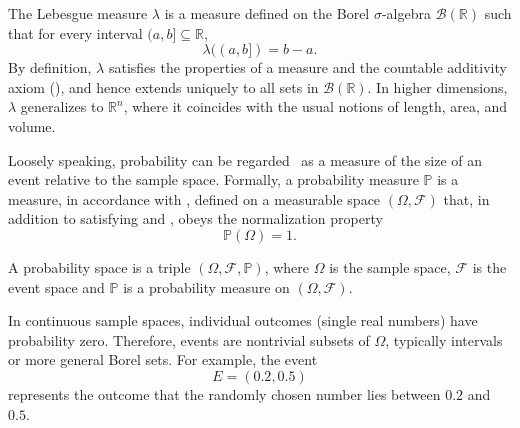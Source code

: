 \begin{definition}
	\label{def:lebesgue_measure}
	The Lebesgue measure $\lambda$ is a measure defined on the Borel $\sigma$-algebra $\mathcal{B}(\mathbb{R})$ such that for every interval $(a,b] \subseteq \mathbb{R}$,
	\begin{equation}
		\lambda((a,b]) = b-a.
	\end{equation}
	By definition, $\lambda$ satisfies the properties of a measure and the countable additivity axiom (), and hence extends uniquely to all sets in $\mathcal{B}(\mathbb{R})$. In higher dimensions, $\lambda$ generalizes to $\mathbb{R}^n$, where it coincides with the usual notions of length, area, and volume.
\end{definition}

\begin{definition}
	\label{def:probability}
	Loosely speaking, probability can be regarded~\cite{chan2021introduction} as a measure of the size of an event relative to the sample space. Formally, a probability measure $\mathbb{P}$ is a measure, in accordance with , defined on a measurable space $(\Omega, \mathcal{F})$ that, in addition to satisfying  and , obeys the normalization property
	\begin{equation}
		\mathbb{P}(\Omega) = 1.
	\end{equation}
\end{definition}

\begin{definition}
	\label{def:probability_space}
	A probability space is a triple $(\Omega, \mathcal{F}, \mathbb{P})$, where $\Omega$ is the sample space,	$\mathcal{F}$ is the event space and $\mathbb{P}$ is a probability measure on $(\Omega, \mathcal{F})$.
\end{definition}

\begin{remark}
	In continuous sample spaces, individual outcomes (single real numbers) have probability zero. Therefore, events are nontrivial subsets of $\Omega$, typically intervals or more general Borel sets. For example, the event 
	\begin{equation}
		E = (0.2, 0.5)
	\end{equation} 
	represents the outcome that the randomly chosen number lies between $0.2$ and $0.5$.
\end{remark}

